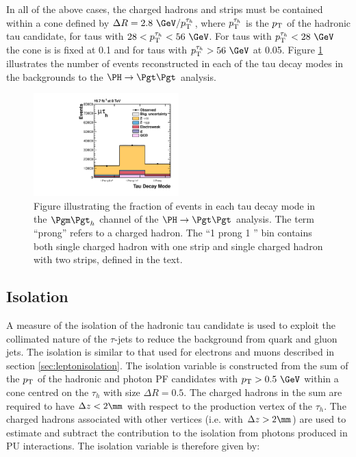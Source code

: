 In all of the above cases, the charged hadrons and strips must be contained
within a cone defined by $\Delta R=2.8~\GeV/\pt^{\tau_{h}}$, where
$p_{\mathrm{T}}^{\tau_{h}}$ is the $p_{\mathrm{T}}$ of the hadronic tau candidate, for taus with $28 <
\pt^{\tau_{h}} < 56~\GeV$. For taus with $\pt^{\tau_{h}} < 28~\GeV$ the cone is
is fixed at 0.1 and for taus with $\pt^{\tau_{h}} > 56~\GeV$ at 0.05. 
Figure \ref{fig:taudecaymode} illustrates the number of events reconstructed in
each of the tau decay modes in the backgrounds to the $\PH \to \Pgt\Pgt$ analysis.

\begin{figure}
\begin{center}
    \includegraphics[width=0.5\textwidth]
      {plots/reco/tau_decay_mode_inclusive_mt_2012.pdf}
\end{center}
\caption[Figure illustrating the fraction of events in each tau decay mode in the
$\mutau$ channel of the $\PH\to\Pgt\Pgt$ analysis.]
{Figure illustrating the fraction of events in each tau decay mode in the
$\mutau$ channel of the $\PH\to\Pgt\Pgt$ analysis. The term ``prong'' refers to a
charged hadron. The ``1 prong 1 \Pgpz'' bin contains both single charged hadron
with one strip and single charged hadron with two strips, defined in the text.
}
\label{fig:taudecaymode}
\end{figure}

\subsection{Isolation}
\label{sec:tauisolation}

A measure of the isolation of the hadronic tau candidate is used to exploit the
collimated nature of the $\tau$-jets to reduce the background from quark and gluon
jets. The isolation is similar to that used for electrons and muons described in
section \ref{sec:leptonisolation}. The isolation variable is constructed from 
the sum of the $p_{\mathrm{T}}$ of the
hadronic and photon \ac{PF} candidates with $\pt > 0.5~\GeV$ within a cone centred on 
the $\tau_{h}$ with size $\Delta R = 0.5$. The charged hadrons in the sum are
required to have $\Delta z < 2\mm$ with respect to the production vertex of the
$\tau_{h}$. The charged hadrons associated with other vertices (i.e. with
$\Delta z > 2\mm$) are used to
estimate and subtract the contribution to the isolation from photons produced in
\ac{PU} interactions. The isolation variable is therefore given by:

